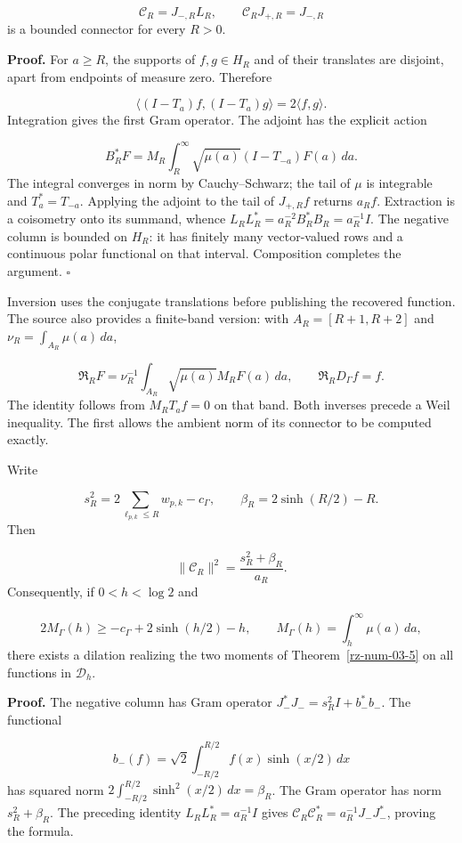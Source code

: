 \[
\mathcal C_R=J_{-,R}L_R,\qquad
\mathcal C_RJ_{+,R}=J_{-,R}
\]
is a bounded connector for every \(R>0\).

\textbf{Proof.} For \(a\geq R\), the supports of \(f,g\in H_R\) and of their translates are disjoint, apart from endpoints of measure zero. Therefore

\[
\langle(I-T_a)f,(I-T_a)g\rangle=2\langle f,g\rangle.
\]
Integration gives the first Gram operator. The adjoint has the explicit action

\[
B_R^*F=M_R\int_R^\infty\sqrt{\mu(a)}(I-T_{-a})F(a)\,da.
\]
The integral converges in norm by Cauchy–Schwarz; the tail of \(\mu\) is integrable and \(T_a^*=T_{-a}\). Applying the adjoint to the tail of \(J_{+,R}f\) returns \(a_Rf\). Extraction is a coisometry onto its summand, whence \(L_RL_R^*=a_R^{-2}B_R^*B_R=a_R^{-1}I\). The negative column is bounded on \(H_R\): it has finitely many vector-valued rows and a continuous polar functional on that interval. Composition completes the argument. \hfill\(\square\)

Inversion uses the conjugate translations before publishing the recovered function. The source also provides a finite-band version: with \(A_R=[R+1,R+2]\) and \(\nu_R=\int_{A_R}\mu(a)\,da\),

\[
\mathfrak R_RF=\nu_R^{-1}\int_{A_R}
\sqrt{\mu(a)}M_RF(a)\,da,\qquad
\mathfrak R_RD_\Gamma f=f.
\]
The identity follows from \(M_RT_af=0\) on that band. Both inverses precede a Weil inequality. The first allows the ambient norm of its connector to be computed exactly.

Write

\[
s_R^2=2\sum_{\ell_{p,k}\leq R}w_{p,k}-c_\Gamma,\qquad
\beta_R=2\sinh(R/2)-R.
\]
Then

\[
\|\mathcal C_R\|^2=\frac{s_R^2+\beta_R}{a_R}.
\]
Consequently, if \(0<h<\log2\) and

\[
2M_\Gamma(h)\geq-c_\Gamma+2\sinh(h/2)-h,\qquad
M_\Gamma(h)=\int_h^\infty\mu(a)\,da,
\]
there exists a dilation realizing the two moments of Theorem~\ref{rz-num-03-5} on all functions in \(\mathcal D_h\).

\textbf{Proof.} The negative column has Gram operator \(J_-^*J_-=s_R^2I+b_-^*b_-\). The functional

\[
b_-(f)=\sqrt2\int_{-R/2}^{R/2}f(x)\sinh(x/2)\,dx
\]
has squared norm \(2\int_{-R/2}^{R/2}\sinh^2(x/2)\,dx=\beta_R\). The Gram operator has norm \(s_R^2+\beta_R\). The preceding identity \(L_RL_R^*=a_R^{-1}I\) gives \(\mathcal C_R\mathcal C_R^*=a_R^{-1}J_-J_-^*\), proving the formula.

